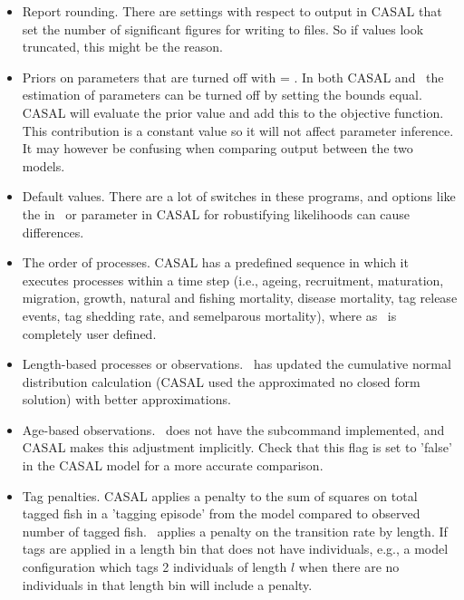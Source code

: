 \begin{itemize}
	\item Report rounding. There are settings with respect to output in CASAL that set the number of significant figures for writing to files. So if values look truncated, this might be the reason.
	
	\item Priors on parameters that are turned off with  = . In both CASAL and \CNAME\ the estimation of parameters can be turned off by setting the bounds equal. CASAL will evaluate the prior value and add this to the objective function.  This contribution is a constant value so it will not affect parameter inference. It may however be confusing when comparing output between the two models.
	
	\item Default values. There are a lot of switches in these programs, and options like the  in \CNAME\ or  parameter in CASAL for robustifying likelihoods can cause differences.
	
	\item The order of processes. CASAL has a predefined sequence in which it executes processes within a time step (i.e., ageing, recruitment, maturation, migration, growth, natural and fishing mortality, disease mortality, tag release events, tag shedding rate, and semelparous mortality), where as \CNAME\ is completely user defined.
		
	\item Length-based processes or observations. \CNAME\ has updated the cumulative normal distribution calculation (CASAL used the approximated no closed form solution) with better approximations.
	
	\item Age-based observations. \CNAME\ does not have the  subcommand implemented, and CASAL makes this adjustment implicitly. Check that this flag is set to 'false' in the CASAL model for a more accurate comparison.
	
	\item Tag penalties. CASAL applies a penalty to the sum of squares on total tagged fish in a 'tagging episode' from the model compared to observed number of tagged fish. \CNAME\ applies a penalty on the transition rate by length. If tags are applied in a length bin that does not have individuals, e.g., a model configuration which tags 2 individuals of length $l$ when there are no individuals in that length bin will include a penalty.
\end{itemize}


